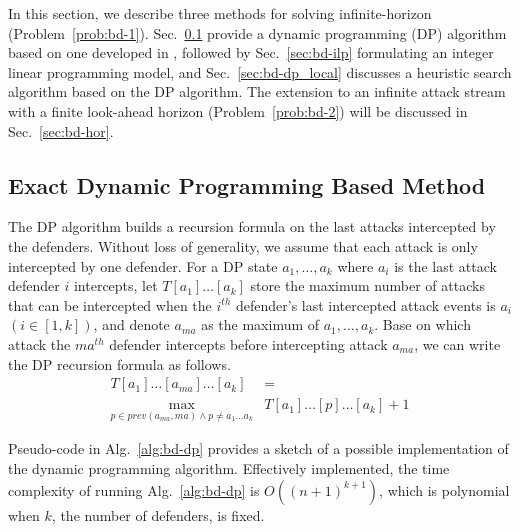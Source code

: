 In this section, we describe three methods for solving infinite-horizon \prob (Problem~\ref{prob:bd-1}).
Sec.~\ref{sec:bd-dp} provide a dynamic programming (DP) algorithm based on one developed in \cite{adler2022role}, 
followed by Sec.~\ref{sec:bd-ilp} formulating an integer linear programming model,
and Sec.~\ref{sec:bd-dp_local} discusses a heuristic search algorithm based on the DP algorithm. 
The extension to an infinite attack stream with a finite look-ahead horizon  (Problem~\ref{prob:bd-2}) will be discussed in Sec.~\ref{sec:bd-hor}.


\subsection{Exact Dynamic Programming Based Method}%
\label{sec:bd-dp}

The DP algorithm builds a recursion formula on the last attacks intercepted by the defenders.
Without loss of generality, we assume that each attack is only intercepted by one defender.
For a DP state $a_1, \dots, a_k$ where $a_i$ is the last attack defender $i$ intercepts, 
let $T[a_1]\dots[a_k]$ store the maximum number of attacks that can be intercepted when the $i^{th}$ defender's last intercepted attack events is $a_i$ $(i\in[1,k])$,
and denote $a_{ma}$ as the maximum of $a_1, \dots, a_k$.
Base on which attack the $ma^{th}$ defender intercepts before intercepting attack $a_{ma}$,
we can write the DP recursion formula as follows.
\begin{equation}
\begin{split}
T[a_1]\dots[a_{ma}]\dots[a_k] &= \\ 
\max_{p\in prev(a_{ma}, ma) \wedge p\neq a_1 \dots a_k} &  T[a_1]\dots[p]\dots[a_k] + 1
\end{split}
\end{equation}

Pseudo-code in Alg.~\ref{alg:bd-dp} provides a sketch of a possible implementation of the dynamic programming algorithm.
Effectively implemented, the time complexity of running Alg.~\ref{alg:bd-dp} is $O( (n+1)^{k+1})$, which is polynomial when $k$, the number of defenders, is fixed.
\vspace{-2mm}


